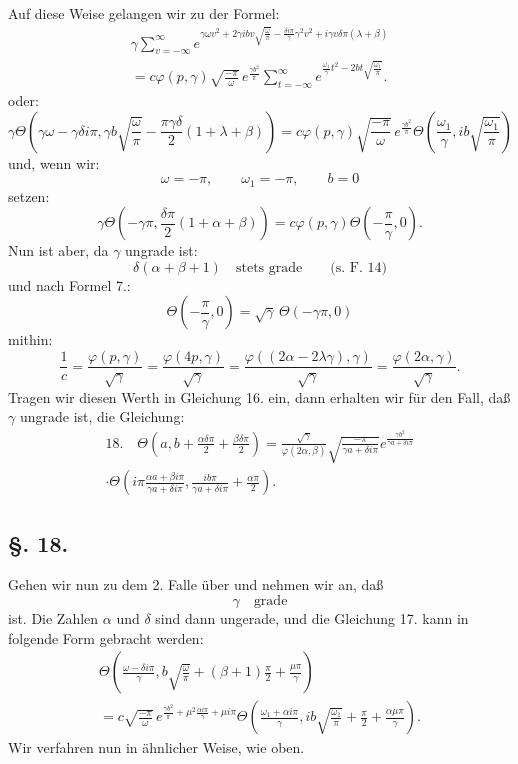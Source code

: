 \documentclass[10pt]{article}
\newcommand{\sourceanchor}[1]{\hypertarget{source-#1}{}}
\begin{document}
Auf diese Weise gelangen wir zu der Formel:
\begin{multline*}
\gamma\sum_{v=-\infty}^{\infty}
 e^{\gamma\omega v^{2}+2\gamma ibv\sqrt{\frac{\omega}{\pi}}-\frac{\delta i\pi}{\gamma}\gamma^{2}v^{2}+i\gamma v\delta\pi(\lambda+\beta)}\\
=c\varphi(p,\gamma)\sqrt{\frac{-\pi}{\omega}}\,e^{\frac{\gamma b^{2}}{\pi}}
\sum_{t=-\infty}^{\infty}e^{\frac{\omega_{1}}{\gamma}t^{2}-2bt\sqrt{\frac{\omega_{1}}{\pi}}}.
\end{multline*}
oder:
\begin{equation*}
\gamma\Theta\!\left(\gamma\omega-\gamma\delta i\pi,
 \gamma b\sqrt{\frac{\omega}{\pi}}-\frac{\pi\gamma\delta}{2}(1+\lambda+\beta)\right)
=c\varphi(p,\gamma)\sqrt{\frac{-\pi}{\omega}}\,e^{\frac{\gamma b^{2}}{\pi}}
\Theta\!\left(\frac{\omega_{1}}{\gamma},ib\sqrt{\frac{\omega_{1}}{\pi}}\right)
\end{equation*}
und, wenn wir:
\[
\omega=-\pi,
\qquad \omega_{1}=-\pi,
\qquad b=0
\]
setzen:
\[
\gamma\Theta\!\left(-\gamma\pi,\frac{\delta\pi}{2}(1+\alpha+\beta)\right)
=c\varphi(p,\gamma)\Theta\!\left(-\frac{\pi}{\gamma},0\right).
\]
Nun ist aber, da \(\gamma\) ungrade ist:
\[
\delta(\alpha+\beta+1)\quad\text{stets grade} \qquad\text{(s. F. 14)}
\]
und nach Formel 7.:
\[
\Theta\!\left(-\frac{\pi}{\gamma},0\right)=\sqrt{\gamma}\,\Theta(-\gamma\pi,0)
\]
mithin:
\[
\frac{1}{c}=\frac{\varphi(p,\gamma)}{\sqrt{\gamma}}
=\frac{\varphi(4p,\gamma)}{\sqrt{\gamma}}
=\frac{\varphi((2\alpha-2\lambda\gamma),\gamma)}{\sqrt{\gamma}}
=\frac{\varphi(2\alpha,\gamma)}{\sqrt{\gamma}}.
\]
Tragen wir diesen Werth in Gleichung 16. ein, dann erhalten wir für den Fall, daß \(\gamma\) ungrade ist, die Gleichung:
\begin{multline*}
18.\quad
\Theta\!\left(a,b+\frac{\alpha\delta\pi}{2}+\frac{\beta\delta\pi}{2}\right)
=\frac{\sqrt{\gamma}}{\varphi(2\alpha,\beta)}
\sqrt{\frac{-\pi}{\gamma a+\delta i\pi}}
 e^{\frac{\gamma b^{2}}{\gamma a+\delta i\pi}}\\
\cdot\Theta\!\left(i\pi\frac{\alpha a+\beta i\pi}{\gamma a+\delta i\pi},
\frac{ib\pi}{\gamma a+\delta i\pi}+\frac{\alpha\pi}{2}\right).
\end{multline*}

\subsection*{\S. 18.}
Gehen wir nun zu dem 2. Falle über und nehmen wir an, daß
\[
\gamma\quad\text{grade}
\]
\sourceanchor{PA15}
ist. Die Zahlen \(\alpha\) und \(\delta\) sind dann ungerade, und die Gleichung 17. kann in folgende Form gebracht werden:
\begin{multline*}
\Theta\!\left(\frac{\omega-\delta i\pi}{\gamma},
 b\sqrt{\frac{\omega}{\pi}}+(\beta+1)\frac{\pi}{2}+\frac{\mu\pi}{\gamma}\right)\\
=c\sqrt{\frac{-\pi}{\omega}}\,e^{\frac{\gamma b^{2}}{\pi}+\mu^{2}\frac{\alpha i\pi}{\gamma}+\mu i\pi}
\Theta\!\left(\frac{\omega_{1}+\alpha i\pi}{\gamma},
 ib\sqrt{\frac{\omega_{1}}{\pi}}+\frac{\pi}{2}+\frac{\alpha\mu\pi}{\gamma}\right).
\end{multline*}
Wir verfahren nun in ähnlicher Weise, wie oben.
\end{document}
